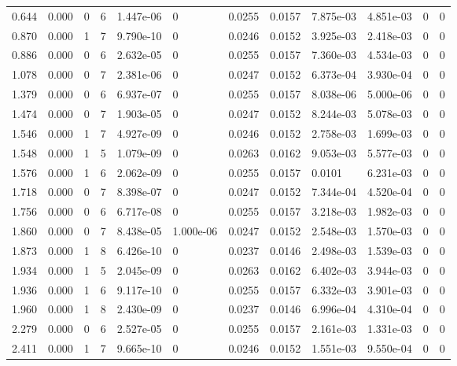 \documentclass[preview]{standalone}
\begin{document}
{{\begin{tabular}{L{1.2cm}C{1.2cm} C{0.3cm}C{0.5cm} C{1.4cm}C{1.4cm} C{1.4cm}C{1.4cm} C{1.6cm}C{1.6cm} C{1.6cm}C{1.6cm}}
  0.644  &  0.000  & 0     &  6 &  1.447e-06  & 0  &  0.0255&   0.0157& 7.875e-03 & 4.851e-03   &  0 & 0  \\ 
  0.870  &  0.000  & 1     &  7 &  9.790e-10  & 0  &  0.0246&   0.0152& 3.925e-03 & 2.418e-03   &  0 & 0  \\ 
  0.886  &  0.000  & 0     &  6 &  2.632e-05  & 0  &  0.0255&   0.0157& 7.360e-03 & 4.534e-03   &  0 & 0  \\ 
  1.078  &  0.000  & 0     &  7 &  2.381e-06  & 0  &  0.0247&   0.0152& 6.373e-04 & 3.930e-04   &  0 & 0  \\ 
  1.379  &  0.000  & 0     &  6 &  6.937e-07  & 0  &  0.0255&   0.0157& 8.038e-06 & 5.000e-06   &  0 & 0  \\ 
  1.474  &  0.000  & 0     &  7 &  1.903e-05  & 0  &  0.0247&   0.0152& 8.244e-03 & 5.078e-03   &  0 & 0  \\ 
  1.546  &  0.000  & 1     &  7 &  4.927e-09  & 0  &  0.0246&   0.0152& 2.758e-03 & 1.699e-03   &  0 & 0  \\ 
  1.548  &  0.000  & 1     &  5 &  1.079e-09  & 0  &  0.0263&   0.0162& 9.053e-03 & 5.577e-03   &  0 & 0  \\ 
  1.576  &  0.000  & 1     &  6 &  2.062e-09  & 0  &  0.0255&   0.0157& 0.0101 & 6.231e-03   &  0 & 0  \\ 
  1.718  &  0.000  & 0     &  7 &  8.398e-07  & 0  &  0.0247&   0.0152& 7.344e-04 & 4.520e-04   &  0 & 0  \\ 
  1.756  &  0.000  & 0     &  6 &  6.717e-08  & 0  &  0.0255&   0.0157& 3.218e-03 & 1.982e-03   &  0 & 0  \\ 
  1.860  &  0.000  & 0     &  7 &  8.438e-05  & 1.000e-06  &  0.0247&   0.0152& 2.548e-03 & 1.570e-03   &  0 & 0  \\ 
  1.873  &  0.000  & 1     &  8 &  6.426e-10  & 0  &  0.0237&   0.0146& 2.498e-03 & 1.539e-03   &  0 & 0  \\ 
  1.934  &  0.000  & 1     &  5 &  2.045e-09  & 0  &  0.0263&   0.0162& 6.402e-03 & 3.944e-03   &  0 & 0  \\ 
  1.936  &  0.000  & 1     &  6 &  9.117e-10  & 0  &  0.0255&   0.0157& 6.332e-03 & 3.901e-03   &  0 & 0  \\ 
  1.960  &  0.000  & 1     &  8 &  2.430e-09  & 0  &  0.0237&   0.0146& 6.996e-04 & 4.310e-04   &  0 & 0  \\ 
  2.279  &  0.000  & 0     &  6 &  2.527e-05  & 0  &  0.0255&   0.0157& 2.161e-03 & 1.331e-03   &  0 & 0  \\ 
  2.411  &  0.000  & 1     &  7 &  9.665e-10  & 0  &  0.0246&   0.0152& 1.551e-03 & 9.550e-04   &  0 & 0  \\ 

\end{tabular}}}
\end{document}
